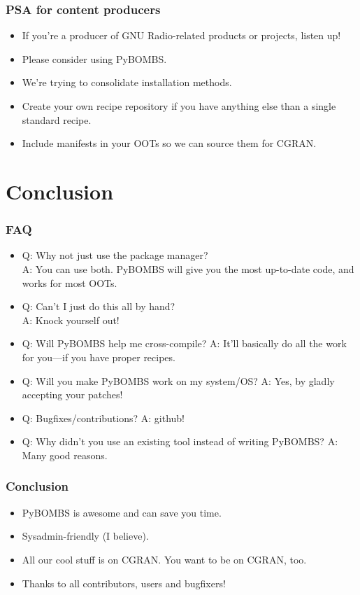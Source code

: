 \documentclass{beamer}
\begin{document}
\begin{frame}
  \frametitle{PSA for content producers}
  \begin{itemize}
    \item If you're a producer of GNU Radio-related products or projects, listen up!
    \item Please consider using PyBOMBS\@.
    \item We're trying to consolidate installation methods.
    \item Create your own recipe repository if you have anything else than a single standard recipe.
    \item Include manifests in your OOTs so we can source them for CGRAN\@.
  \end{itemize}
\end{frame}

\section{Conclusion}
\begin{frame}
  \frametitle{FAQ}
  \begin{itemize}
    \item Q\@: Why not just use the package manager?\\A\@: You can use both. PyBOMBS will give you the most up-to-date code, and works for most OOTs.
    \item Q\@: Can't I just do this all by hand?\\A\@: Knock yourself out!
    \item Q\@: Will PyBOMBS help me cross-compile? A\@: It'll basically do all the work for you---if you have proper recipes.
    \item Q\@: Will you make PyBOMBS work on my system/OS\@? A\@: Yes, by gladly accepting your patches!
    \item Q\@: Bugfixes/contributions? A\@: github!
    \item Q\@: Why didn't you use an existing tool instead of writing PyBOMBS\@? A\@: Many good reasons.
  \end{itemize}
\end{frame}

\begin{frame}
  \frametitle{Conclusion}
  \begin{itemize}
    \item PyBOMBS is awesome and can save you time.
    \item Sysadmin-friendly (I believe).
    \item All our cool stuff is on CGRAN\@. You want to be on CGRAN, too.
    \item Thanks to all contributors, users and bugfixers!
  \end{itemize}
\end{frame}
\end{document}
